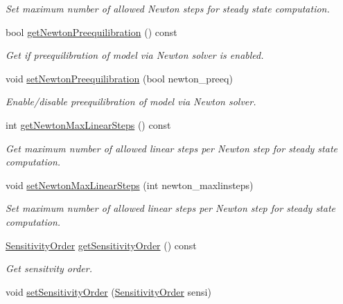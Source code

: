 \begin{DoxyCompactItemize}
\begin{DoxyCompactList}\small\item\em Set maximum number of allowed Newton steps for steady state computation. \end{DoxyCompactList}\item 
bool \mbox{\hyperlink{classamici_1_1_solver_a75aabe2e004edaba96db48b0abd3fc6f}{get\+Newton\+Preequilibration}} () const
\begin{DoxyCompactList}\small\item\em Get if preequilibration of model via Newton solver is enabled. \end{DoxyCompactList}\item 
void \mbox{\hyperlink{classamici_1_1_solver_a8e71a26a59a4c3c03b362a72079377f2}{set\+Newton\+Preequilibration}} (bool newton\+\_\+preeq)
\begin{DoxyCompactList}\small\item\em Enable/disable preequilibration of model via Newton solver. \end{DoxyCompactList}\item 
int \mbox{\hyperlink{classamici_1_1_solver_a874c929a78d0e2af11c62ba958e1b3d1}{get\+Newton\+Max\+Linear\+Steps}} () const
\begin{DoxyCompactList}\small\item\em Get maximum number of allowed linear steps per Newton step for steady state computation. \end{DoxyCompactList}\item 
void \mbox{\hyperlink{classamici_1_1_solver_af9143ab28630d5db394f641df0a8e477}{set\+Newton\+Max\+Linear\+Steps}} (int newton\+\_\+maxlinsteps)
\begin{DoxyCompactList}\small\item\em Set maximum number of allowed linear steps per Newton step for steady state computation. \end{DoxyCompactList}\item 
\mbox{\hyperlink{namespaceamici_aaa03ec2f8c4d5323b98d71134a462fda}{Sensitivity\+Order}} \mbox{\hyperlink{classamici_1_1_solver_affde3089fec2a1cca40d6cc0c4c2cf1d}{get\+Sensitivity\+Order}} () const
\begin{DoxyCompactList}\small\item\em Get sensitvity order. \end{DoxyCompactList}\item 
void \mbox{\hyperlink{classamici_1_1_solver_a26129f061fdf7869be2d3e4aa22532b6}{set\+Sensitivity\+Order}} (\mbox{\hyperlink{namespaceamici_aaa03ec2f8c4d5323b98d71134a462fda}{Sensitivity\+Order}} sensi)

\end{DoxyCompactItemize}
